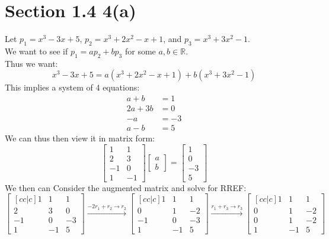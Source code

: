 \documentclass{article}
\begin{document}
\section*{Section 1.4 4(a)}
Let $p_1 = x^3 - 3x + 5$, $p_2 = x^3 + 2x^2 - x + 1$, and $p_3 = x^3 + 3x^2 - 1$.\\
We want to see if $p_1 = ap_2 + bp_3$ for some $a,b \in \mathds{R}$.\\
Thus we want:
$$ x^3 - 3x + 5 = a(x^3 + 2x^2 - x + 1) + b(x^3 + 3x^2 - 1) $$
This implies a system of 4 equations:
\begin{align*}
    a + b &= 1\\
    2a + 3b &= 0\\
    -a &= -3\\
    a - b &= 5 
\end{align*}
We can thus then view it in matrix form:
$$ \begin{bmatrix} 1 & 1 \\ 2 & 3 \\ -1 & 0 \\ 1 & -1 \end{bmatrix} \begin{bmatrix} a \\ b \end{bmatrix} = \begin{bmatrix} 1 \\ 0 \\ -3 \\ 5 \end{bmatrix} $$
We then can Consider the augmented matrix and solve for RREF:
$$ 
\begin{bmatrix}[cc|c]
    1 & 1 & 1\\
    2 & 3 & 0\\
    -1 & 0 & -3\\
    1 & -1 & 5
\end{bmatrix} \xrightarrow{-2r_1 + r_2 \rightarrow r_2} \begin{bmatrix}[cc|c]
    1 & 1 & 1\\
    0 & 1 & -2\\
    -1 & 0 & -3\\
    1 & -1 & 5
\end{bmatrix} \xrightarrow{r_1 + r_3 \rightarrow r_3} \begin{bmatrix}[cc|c]
    1 & 1 & 1\\
    0 & 1 & -2\\
    0 & 1 & -2\\
    1 & -1 & 5
\end{bmatrix}$$
\end{document}

